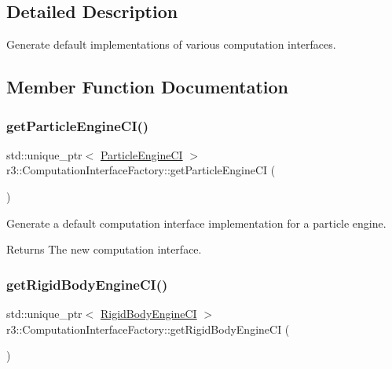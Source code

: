 \subsection{Detailed Description}
Generate default implementations of various computation interfaces. 

\subsection{Member Function Documentation}
\mbox{\label{classr3_1_1_computation_interface_factory_a7b9e6f01921567e1530aac9c10e8a7c0}} 
\subsubsection{\texorpdfstring{get\+Particle\+Engine\+C\+I()}{getParticleEngineCI()}}
{\footnotesize\ttfamily std\+::unique\+\_\+ptr$<$ \mbox{\hyperlink{classr3_1_1_particle_engine_c_i}{Particle\+Engine\+CI}} $>$ r3\+::\+Computation\+Interface\+Factory\+::get\+Particle\+Engine\+CI (\begin{DoxyParamCaption}{ }\end{DoxyParamCaption})\hspace{0.3cm}{\ttfamily [static]}}



Generate a default computation interface implementation for a particle engine. 

\begin{DoxyReturn}{Returns}
The new computation interface. 
\end{DoxyReturn}
\mbox{\label{classr3_1_1_computation_interface_factory_a9bc878f2dbfe7dbca2037ba0d5180a5a}} 
\subsubsection{\texorpdfstring{get\+Rigid\+Body\+Engine\+C\+I()}{getRigidBodyEngineCI()}}
{\footnotesize\ttfamily std\+::unique\+\_\+ptr$<$ \mbox{\hyperlink{classr3_1_1_rigid_body_engine_c_i}{Rigid\+Body\+Engine\+CI}} $>$ r3\+::\+Computation\+Interface\+Factory\+::get\+Rigid\+Body\+Engine\+CI (\begin{DoxyParamCaption}{ }\end{DoxyParamCaption})\hspace{0.3cm}{\ttfamily [static]}}



